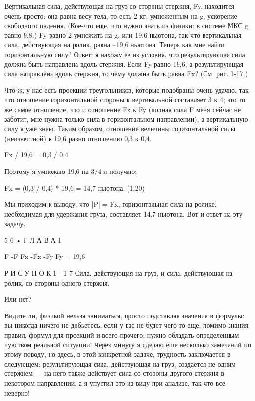 \documentclass[10pt,oneside]{article}
\begin{document}
Вертикальная сила, действующая на груз со стороны стержня, Fy, находится очень просто: она равна весу тела, то есть 2 кг, умноженным на g, ускорение свободного падения. (Кое-что еще, что нужно знать из физики: в системе МКС g равно 9,8.) Fy равно 2 умножить на g, или 19,6 ньютона, так что вертикальная сила, действующая на ролик, равна –19,6 ньютона. Теперь как мне найти горизонтальную силу? Ответ: я нахожу ее из условия, что результирующая сила должна быть направлена вдоль стержня. Если Fy равно 19,6, а результирующая сила направлена вдоль стержня, то чему должна быть равна Fx? (См. рис. 1-17.)\par

Что ж, у нас есть проекции треугольников, которые подобраны очень удачно, так что отношение горизонтальной стороны к вертикальной составляет 3 к 4; это то же самое отношение, что и отношение Fx к Fy (полная сила F меня сейчас не заботит, мне нужна только сила в горизонтальном направлении), а вертикальную силу я уже знаю. Таким образом, отношение величины горизонтальной силы (неизвестной) к 19,6 равно отношению 0,3 к 0,4.\par

Fx / 19,6 = 0,3 / 0,4\par

Поэтому я умножаю 19,6 на 3/4 и получаю:\par

Fx = (0,3 / 0,4) * 19,6 = 14,7 ньютона. (1.20)\par

Мы приходим к выводу, что |P| = Fx, горизонтальная сила на ролике, необходимая для удержания груза, составляет 14,7 ньютона. Вот и ответ на эту задачу.\par

5 6 • Г Л А В А  1\par

F -F Fx -Fx -Fy Fy = 19,6\par

Р И С У Н О К  1 - 1 7 Сила, действующая на груз, и сила, действующая на ролик, со стороны одного стержня.\par

Или нет?\par

Видите ли, физикой нельзя заниматься, просто подставляя значения в формулы: вы никогда ничего не добьетесь, если у вас не будет чего-то еще, помимо знания правил, формул для проекций и всего прочего; нужно обладать определенным чувством реальной ситуации! Через минуту я сделаю еще несколько замечаний по этому поводу, но здесь, в этой конкретной задаче, трудность заключается в следующем: результирующая сила, действующая на груз, создается не одним стержнем --- на него также действует сила со стороны другого стержня в некотором направлении, а я упустил это из виду при анализе, так что все неверно!\par
\end{document}

